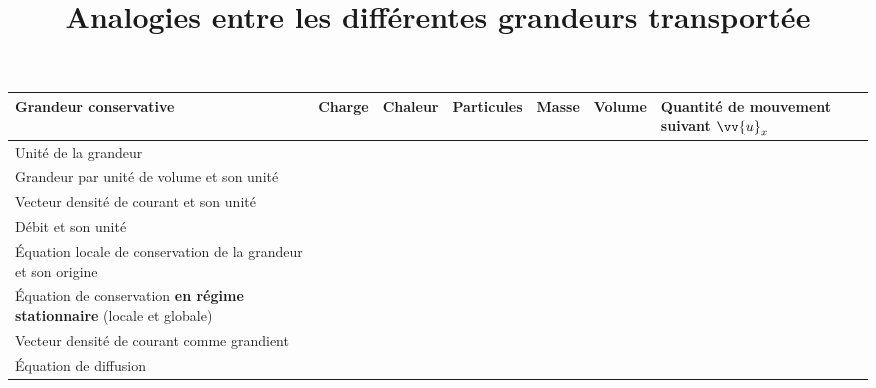 \documentclass{autre}
\title{Analogies entre les différentes grandeurs transportée}
\date{}
\begin{document}
  \maketitle{}\thispagestyle{empty}
  \setlength{\extrarowheight}{40pt}
  \renewcommand{\tabularxcolumn}[1]{>{\small}m{#1}}
  \noindent
  \begin{tabularx}{\textwidth}{| X | C | C | C | C | C | C |}
    \hline
    Grandeur conservative &
    Charge &
    Chaleur &
    Particules &
    Masse &
    Volume &
    Quantité de mouvement suivant $\vv{u}_x$\\
    \hline
    Unité de la grandeur & 
    &
     &
     &
     &
     &
    \\
    \hline
    \vspace{1em}Grandeur par unité de volume et son unité\vspace{1em} &
     &
     &
     &
     &
     &
    \\
    \hline
    Vecteur densité de courant et son unité &
     &
     &
     &
     &
     &
     \\
    \hline
    Débit et son unité &
     &
     &
     &
     &
     &
     \\
    \hline
    Équation locale de conservation de la grandeur et son origine &
     &
     &
     &
     &
     &
     \\
    \hline
    Équation de conservation \textbf{en régime stationnaire} (locale et globale) &
    &
    &
    &
    &
    &
     \\
    \hline
    Vecteur densité de courant comme grandient &
     &
     &
     &
     &
     &
     \\
    \hline
    Équation de diffusion & &
     &
     &
     &
     &
     \\
    \hline
  \end{tabularx}
\end{document}
